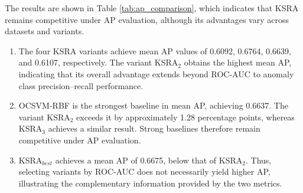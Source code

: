 \documentclass[ASNA,twocolumn]{USG} %
\begin{document}
The results are shown in Table \ref{tab:ap_comparison}, which indicates that KSRA remains competitive under AP evaluation, although its advantages vary across datasets and variants.
\begin{enumerate}
    \item The four KSRA variants achieve mean AP values of 0.6092, 0.6764, 0.6639, and 0.6107, respectively. The variant KSRA$_2$ obtains the highest mean AP, indicating that its overall advantage extends beyond ROC-AUC to anomaly class precision–recall performance.

    \item OCSVM-RBF is the strongest baseline in mean AP, achieving 0.6637. The variant KSRA$_2$ exceeds it by approximately 1.28 percentage points, whereas KSRA$_3$ achieves a similar result. Strong baselines therefore remain competitive under AP evaluation.
    
    \item KSRA$_{best}$ achieves a mean AP of 0.6675, below that of KSRA$_2$. Thus, selecting variants by ROC-AUC does not necessarily yield higher AP, illustrating the complementary information provided by the two metrics.
\end{enumerate}
\end{document}
